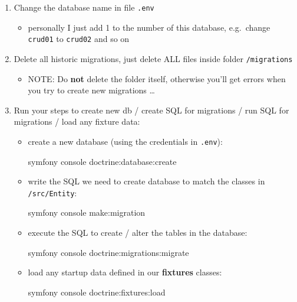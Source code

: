 \documentclass[a4paperpaper,openright]{book}
\newenvironment{Shaded}{}{}
\newcommand{\ExtensionTok}[1]{#1}
\newcommand{\NormalTok}[1]{#1}
\providecommand{\tightlist}{%
  \setlength{\itemsep}{0pt}\setlength{\parskip}{0pt}}
\begin{document}
\begin{enumerate}
\def\labelenumi{\arabic{enumi}.}
\item
  Change the database name in file \texttt{.env}

  \begin{itemize}
  \tightlist
  \item
    personally I just add 1 to the number of this database, e.g.~change
    \texttt{crud01} to \texttt{crud02} and so on
  \end{itemize}
\item
  Delete all historic migrations, just delete ALL files inside folder
  \texttt{/migrations}

  \begin{itemize}
  \tightlist
  \item
    NOTE: Do \textbf{not} delete the folder itself, otherwise you'll get
    errors when you try to create new migrations \ldots{}
  \end{itemize}
\item
  Run your steps to create new db / create SQL for migrations / run SQL
  for migrations / load any fixture data:

  \begin{itemize}
  \item
    create a new database (using the credentials in \texttt{.env}):

\begin{Shaded}
\begin{Highlighting}[]
\ExtensionTok{symfony}\NormalTok{ console doctrine:database:create}
\end{Highlighting}
\end{Shaded}
  \item
    write the SQL we need to create database to match the classes in
    \texttt{/src/Entity}:

\begin{Shaded}
\begin{Highlighting}[]
\ExtensionTok{symfony}\NormalTok{ console make:migration}
\end{Highlighting}
\end{Shaded}
  \item
    execute the SQL to create / alter the tables in the database:

\begin{Shaded}
\begin{Highlighting}[]
\ExtensionTok{symfony}\NormalTok{ console doctrine:migrations:migrate}
\end{Highlighting}
\end{Shaded}
  \item
    load any startup data defined in our \textbf{fixtures} classes:

\begin{Shaded}
\begin{Highlighting}[]
\ExtensionTok{symfony}\NormalTok{ console doctrine:fixtures:load}
\end{Highlighting}
\end{Shaded}
  \end{itemize}
\end{enumerate}
\end{document}
